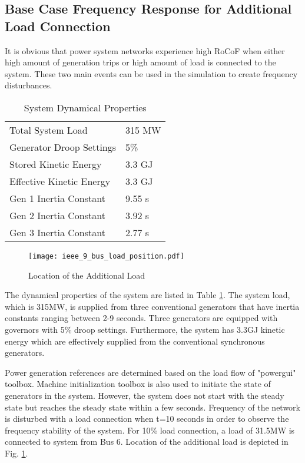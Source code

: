 \subsection{Base Case Frequency Response for Additional Load Connection}
It is obvious that power system networks experience high RoCoF when either high amount of generation trips or high amount of load is connected to the system. These two main events can be used in the simulation to create frequency disturbances.\par
\begin{table}[h]
	\centering
	\begin{tabular}{ll}
		\hline
		Total System Load                      & 315 MW    \\
		Generator Droop Settings               & 5\%       \\
		Stored Kinetic Energy                  & 3.3 GJ \\
		Effective Kinetic Energy               & 3.3 GJ \\
		Gen 1 Inertia Constant                 & 9.55 s  \\
		Gen 2 Inertia Constant                 & 3.92 s  \\
		Gen 3 Inertia Constant                 & 2.77 s  \\ \hline
	\end{tabular}
	\caption{System Dynamical Properties}
	\label{systemdynamicaldata}
\end{table}
\begin{figure}[h!]
	\centering
	\texttt{[image: ieee\_9\_bus\_load\_position.pdf]}
	\caption{Location of the Additional Load}
	\label{ieee_9_bus_load}
\end{figure}
The dynamical properties of the system are listed in Table \ref{systemdynamicaldata}. The system load, which is 315MW, is supplied from three conventional generators that have inertia constants ranging between 2-9 seconds. Three generators are equipped with governors with 5\% droop settings. Furthermore, the system has 3.3GJ kinetic energy which are effectively supplied from the conventional synchronous generators. \par 
Power generation references are determined based on the load flow of "powergui" toolbox. Machine initialization toolbox is also used to initiate the state of generators in the system. However, the system does not start with the steady state but reaches the steady state within a few seconds. Frequency of the network is disturbed with a load connection when t=10 seconds in order to observe the frequency stability of the system. For 10\% load connection, a load of 31.5MW is connected to system from Bus 6. Location of the additional load is depicted in Fig. \ref{ieee_9_bus_load}.\par

